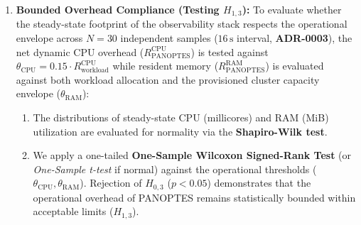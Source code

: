 \begin{enumerate}
    \item \textbf{Bounded Overhead Compliance (Testing $H_{1,3}$):} To evaluate whether the steady-state footprint of the observability stack respects the operational envelope across $N=30$ independent samples ($16\,\text{s}$ interval, \textbf{ADR-0003}), the net dynamic CPU overhead ($R_{\text{PANOPTES}}^{\text{CPU}}$) is tested against $\theta_{\text{CPU}} = 0.15 \cdot R_{\text{workload}}^{\text{CPU}}$ while resident memory ($R_{\text{PANOPTES}}^{\text{RAM}}$) is evaluated against both workload allocation and the provisioned cluster capacity envelope ($\theta_{\text{RAM}}$):
    \begin{enumerate}
        \item The distributions of steady-state CPU (millicores) and RAM (MiB) utilization are evaluated for normality via the \textbf{Shapiro-Wilk test}.
        \item We apply a one-tailed \textbf{One-Sample Wilcoxon Signed-Rank Test} (or \textit{One-Sample t-test} if normal) against the operational thresholds ($\theta_{\text{CPU}}, \theta_{\text{RAM}}$). Rejection of $H_{0,3}$ ($p < 0.05$) demonstrates that the operational overhead of PANOPTES remains statistically bounded within acceptable limits ($H_{1,3}$).
    \end{enumerate}
\end{enumerate}
